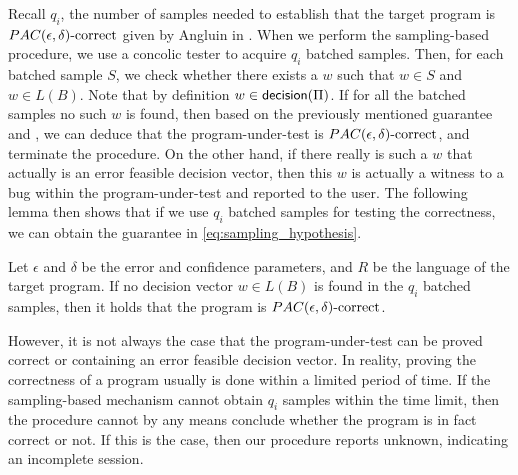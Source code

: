 Recall $q_i$, the number of samples needed to establish that the target program is $PAC(\epsilon, \delta)\text{-correct}$ given by Angluin in \cite{Angluin87}. When we perform the sampling-based procedure, we use a concolic tester to acquire $q_i$ batched samples. Then, for each batched sample $S$, we check whether there exists a $w$ such that $w \in S$ and $w \in L(B)$. Note that by definition $w \in \mathsf{decision}(\Pi)$. If for all the batched samples no such $w$ is found, then based on the previously mentioned guarantee and \cite{Angluin87}, we can deduce that the program-under-test is $PAC(\epsilon, \delta)\text{-correct}$, and terminate the procedure. On the other hand, if there really is such a $w$ that actually is an error feasible decision vector, then this $w$ is actually a witness to a bug within the program-under-test and reported to the user. The following lemma then shows that if we use $q_i$ batched samples for testing the correctness, we can obtain the guarantee in \ref{eq:sampling_hypothesis}.

\begin{lemma}
Let $\epsilon$ and $\delta$ be the error and confidence parameters, and $R$ be the language of the target program. If no decision vector $w \in L(B)$ is found in the $q_i$ batched samples, then it holds that the program is $PAC(\epsilon, \delta)\text{-correct}$.
\end{lemma}

However, it is not always the case that the program-under-test can be proved correct or containing an error feasible decision vector. In reality, proving the correctness of a program usually is done within a limited period of time. If the sampling-based mechanism cannot obtain $q_i$ samples within the time limit, then the procedure cannot by any means conclude whether the program is in fact correct or not. If this is the case, then our procedure reports unknown, indicating an incomplete session. 
